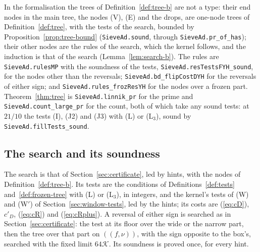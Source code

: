 \documentclass[11pt]{article}
\theoremstyle{definition}
\newcommand{\lean}[1]{\texttt{#1}}
\begin{document}
In the formalisation the trees of Definition~\ref{def:tree-b} are not a type: their
end nodes in the main tree, the nodes (V), (E) and the drops, are one-node trees of Definition~\ref{def:tree}, with
the tests of the search, bounded by Proposition~\ref{prop:tree-bound} (\lean{SieveAd.\allowbreak sound}, through
\lean{SieveAd.\allowbreak pr\_of\_has}); their other nodes are the rules of the search, which the kernel follows, and
the induction is that of the search (Lemma~\ref{lem:search-b}). The rules are
\lean{SieveAd.\allowbreak rulesMP} with the soundness of the tests, \lean{SieveAd.\allowbreak resTestsFYH\_sound}, for
the nodes other than the reversals; \lean{SieveAd.\allowbreak bd\_flipCostDYH} for the reversals of either sign; and
\lean{SieveAd.\allowbreak rules\_frozResYH} for the nodes over a frozen part. Theorem~\ref{thm:tree} is
\lean{SieveAd.\allowbreak linnik\_pr} for the prime and \lean{SieveAd.\allowbreak count\_large\_pr} for the count, both
of which take any sound tests: at $21/10$ the tests (I), (J2) and (J3) with (L) or
(L$_3$), sound by \lean{SieveAd.\allowbreak fillTests\_sound}.

\subsection{The search and its soundness}

The search is that of Section~\ref{sec:certificate}, led by hints, with the nodes of Definition~\ref{def:tree-b}. Its
tests are the conditions of Definitions~\ref{def:tests} and~\ref{def:frozen-tree} with (L) or (L$_3$), in integers, and
the kernel's tests of (W) and (W$'$) of Section~\ref{sec:window-tests}, led by the hints; its
costs are (\ref{eq:cD}), $c'_D$, (\ref{eq:cR}) and (\ref{eq:cRplus}). A reversal of either sign is searched as in
Section~\ref{sec:certificate}: the test at its floor over the wide or the narrow part, then the tree over that part on
$((f, \nu))$, with the sign opposite to the box's, searched with the fixed limit $64\mathcal K$. Its soundness is proved
once, for every hint.
\end{document}
